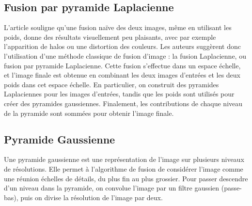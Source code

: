 \documentclass[twoside]{article}
\begin{document}
\subsection{Fusion par pyramide Laplacienne}
L'article souligne qu'une fusion naïve des deux images, même en utilisant les poids, donne des résultats visuellement peu plaisants, avec par exemple l'apparition de halos ou une distortion des couleurs. Les auteurs suggèrent donc l'utilisation d'une méthode classique de fusion d'image : la fusion Laplacienne, ou fusion par pyramide Laplacienne. Cette fusion s'effectue dans un espace échelle, et l'image finale est obtenue en combinant les deux images d'entrées et les deux poids dans cet espace échelle. En particulier, on construit des pyramides Laplaciennes pour les images d'entrées, tandis que les poids sont utilisés pour créer des pyramides gaussiennes. Finalement, les contributions de chaque niveau de la pyramide sont sommées pour obtenir l'image finale.\\

\subsection{Pyramide Gaussienne}
Une pyramide gaussienne est une représentation de l'image sur plusieurs niveaux de résolutions. Elle permet à l'algorithme de fusion de considérer l'image comme une réunion échelles de détails, du plus fin au plus grossier. Pour passer descendre d'un niveau dans la pyramide, on convolue l'image par un filtre gaussien (passe-bas), puis on divise la résolution de l'image par deux.
\end{document}
